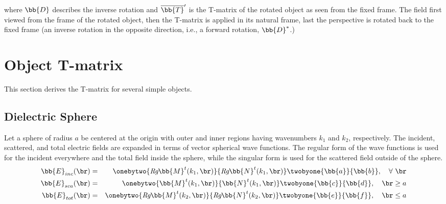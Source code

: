\noindent where $\bb{D}$ describes the inverse rotation and $\overline{\bb{T}}'$ is the T-matrix of the rotated object as seen from the fixed frame. The field first viewed from the frame of the rotated object, then the T-matrix is applied in its natural frame, last the perspective is rotated back to the fixed frame (an inverse rotation in the opposite direction, i.e., a forward rotation, $\bb{D}^*$.)



%
%
%


\clearpage
\newpage
\section{Object T-matrix}

This section derives the T-matrix for several simple objects.

\subsection{Dielectric Sphere}
\label{sec:tmatrixsphere}
Let a sphere of radius $a$ be centered at the origin with outer and inner regions having wavenumbers $k_1$ and $k_2$, respectively.  The incident, scattered, and total electric fields are expanded in terms of vector spherical wave functions. The regular form of the wave functions is used for the incident everywhere and the total field inside the sphere, while the singular form is used for the scattered field outside of the sphere. 
\begin{eqnarray}
\bb{E}_{inc}(\br) &=& \onebytwo{\textit{Rg}\bb{M}^t(k_1,\br)}{\textit{Rg}\bb{N}^t(k_1,\br)}\twobyone{\bb{a}}{\bb{b}}, \quad \forall \ \br \\
\bb{E}_{sca}(\br) &=& \onebytwo{\bb{M}^t(k_1,\br)}{\bb{N}^t(k_1,\br)}\twobyone{\bb{c}}{\bb{d}}, \quad \br \ge a \\
\bb{E}_{tot}(\br) &=& \onebytwo{\textit{Rg}\bb{M}^t(k_2,\br)}{\textit{Rg}\bb{N}^t(k_2,\br)}\twobyone{\bb{e}}{\bb{f}}, \quad \br \le a
\end{eqnarray}


